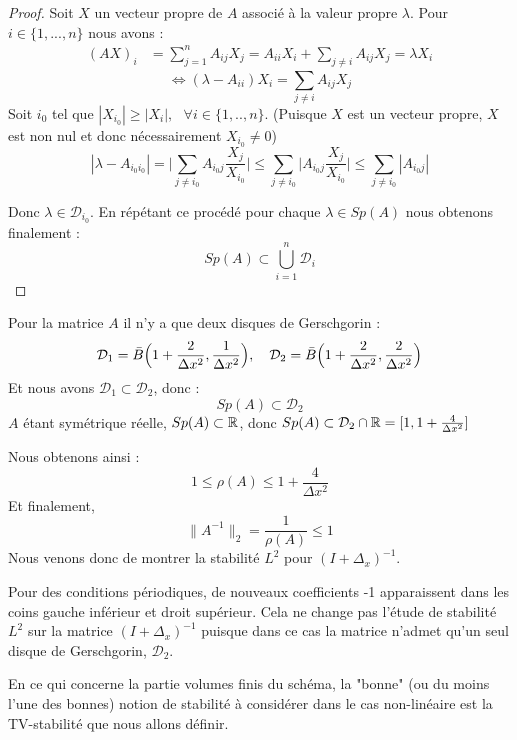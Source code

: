 \begin{proof}
    Soit $X$ un vecteur propre de $A$ associé à la valeur propre $\lambda$. Pour $i \in \{1,...,n \}$ nous avons :
    \begin{equation*}
    \begin{split}
        (AX)_i &= \sum_{j=1}^{n}A_{ij}X_j = A_{ii}X_i + \sum_{j \neq i} A_{ij}X_j = \lambda X_i
    \end{split}
    \end{equation*}
$$\Leftrightarrow (\lambda - A_{ii})X_i = \sum_{j\neq i} A_{ij}X_j$$
Soit $i_0$ tel que $|X_{i_0}| \geq |X_i|, \text{ } \forall i\in \{1,..,n \}$. (Puisque $X$ est un vecteur propre, $X$ est non nul et donc nécessairement $X_{i_0} \neq 0$)
$$|\lambda - A_{i_0i_0}| = \Bigg| \sum_{j\neq i_0} A_{i_0j}\frac{X_j}{X_{i_0}} \Bigg| \leq \sum_{j\neq i_0} \Big| A_{i_0j}\frac{X_j}{X_{i_0}} \Big| \leq \sum_{j\neq i_0} |A_{i_0j}|$$

Donc $\lambda \in \mathcal{D}_{i_0}$.
En répétant ce procédé pour chaque $\lambda\in Sp(A)$ nous obtenons finalement :
$$Sp(A) \subset \bigcup_{i=1}^{n} \mathcal{D}_i $$
\end{proof}

Pour la matrice $A$ il n'y a que deux disques de Gerschgorin :
$$\mathcal{D}_1 = \bar{B}\Bigl(1 + \frac{2}{\Delta x ^2},\frac{1}{\Delta x^2}\Bigr), \quad \mathcal{D}_2 = \bar{B}\Bigl( 1 + \frac{2}{\Delta x^2}, \frac{2}{\Delta x^2} \Bigr)$$
Et nous avons $\mathcal{D}_1 \subset \mathcal{D}_2$, donc :
$$Sp(A) \subset \mathcal{D}_2$$
$A$ étant symétrique réelle, $Sp(A) \subset \mathbb{R}$, donc $Sp(A) \subset \mathcal{D}_2 \cap \mathbb{R} = [ 1,1 + \frac{4}{\Delta x^2} ]$

Nous obtenons ainsi :
$$1 \leq \rho(A) \leq 1 + \frac{4}{\Delta x^2}$$
Et finalement, 
$$\|A^{-1}\|_{2} = \frac{1}{\rho(A)} \leq 1$$
Nous venons donc de montrer la stabilité $L^2$ pour $(I + \Delta_x)^{-1}$.
\begin{remarkbox}
\begin{remark}
    Pour des conditions périodiques, de nouveaux coefficients -1 apparaissent dans les coins gauche inférieur et droit supérieur. 
    Cela ne change pas l'étude de stabilité $L^2$ sur la matrice $(I + \Delta_x)^{-1}$ puisque dans ce cas la matrice n'admet qu'un seul disque de Gerschgorin, $\mathcal{D}_2$.
\end{remark}
\end{remarkbox}
\vspace{1em}

En ce qui concerne la partie volumes finis du schéma, la "bonne" (ou du moins l'une des bonnes) notion de stabilité à considérer dans le cas non-linéaire est la TV-stabilité que nous allons définir. 

